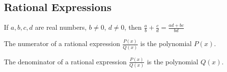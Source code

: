 \documentclass[crop=false,class=article,oneside]{standalone}
\begin{document}
    \subsection{Rational Expressions}
        \begin{theorem}
        \label{theorem:north_shore_cross_multiplying}
        If $a,b,c,d$ are real numbers, $b\ne 0$, $d\ne 0$, then $\frac{a}{b}+\frac{c}{d}=\frac{ad+bc}{bd}$
        \end{theorem}
        \begin{definition}
        \label{definition:north_shore_numerator_of_rational_expression}
        The numerator of a rational expression $\frac{P(x)}{Q(x)}$ is the polynomial $P(x)$.
        \end{definition}
        \begin{definition}
        \label{definition:north_shore_denominator_of_rational_expression}
        The denominator of a rational expression $\frac{P(x)}{Q(x)}$ is the polynomial $Q(x)$.
        \end{definition}
\end{document}
